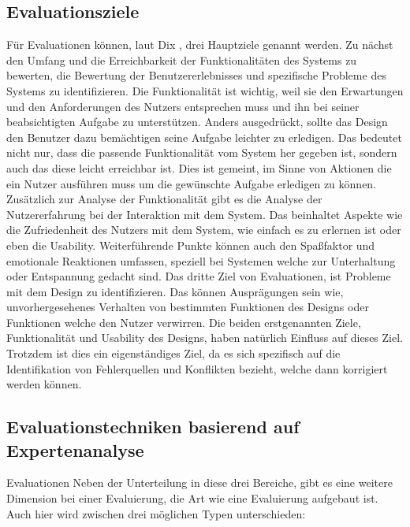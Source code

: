 \documentclass[draft=false
              ,paper=a4
              ,twoside=false
              ,fontsize=11pt
              ,headsepline
              ,BCOR10mm
              ,DIV11
              ]{scrbook}
\begin{document}
\subsection{Evaluationsziele} %
\label{sub:evaluationsziele}

Für Evaluationen können, laut Dix \cite{alan_dix_human-computer_2004}, drei Hauptziele genannt werden. Zu nächst den Umfang und die Erreichbarkeit der Funktionalitäten des Systems zu bewerten, die Bewertung der Benutzererlebnisses und spezifische Probleme des Systems zu identifizieren. Die Funktionalität ist wichtig, weil sie den Erwartungen und den Anforderungen des Nutzers entsprechen muss und ihn bei seiner beabsichtigten Aufgabe zu unterstützen. Anders ausgedrückt, sollte das Design den Benutzer dazu bemächtigen seine Aufgabe leichter zu erledigen. Das bedeutet nicht nur, dass die passende Funktionalität vom System her gegeben ist, sondern auch das diese leicht erreichbar ist. Dies ist gemeint, im Sinne von Aktionen die ein Nutzer ausführen muss um die gewünschte Aufgabe erledigen zu können.
Zusätzlich zur Analyse der Funktionalität gibt es die Analyse der  Nutzererfahrung bei der Interaktion mit dem System. Das beinhaltet Aspekte wie die Zufriedenheit des Nutzers mit dem System, wie einfach es zu erlernen ist oder eben die Usability. Weiterführende Punkte können auch den Spaßfaktor und emotionale Reaktionen umfassen, speziell bei Systemen welche zur Unterhaltung oder Entspannung gedacht sind. 
Das dritte Ziel von Evaluationen, ist Probleme mit dem Design zu identifizieren. Das können Ausprägungen sein wie, unvorhergesehenes Verhalten von bestimmten Funktionen des Designs oder Funktionen welche den Nutzer verwirren. Die beiden erstgenannten Ziele, Funktionalität und Usability des Designs, haben natürlich Einfluss auf dieses Ziel. Trotzdem ist dies ein eigenständiges Ziel, da es sich spezifisch auf die Identifikation von Fehlerquellen und Konflikten bezieht, welche dann korrigiert werden können.

\subsection{Evaluationstechniken basierend auf Expertenanalyse} %
\label{sub:evaluationstechniken_basierend_auf_expertenanalyse}
Evaluationen 
\iffalse
Neben der Unterteilung in diese drei Bereiche, gibt es eine weitere Dimension bei einer Evaluierung, die Art wie eine Evaluierung aufgebaut ist. Auch hier wird zwischen drei möglichen Typen unterschieden:
\end{document}

